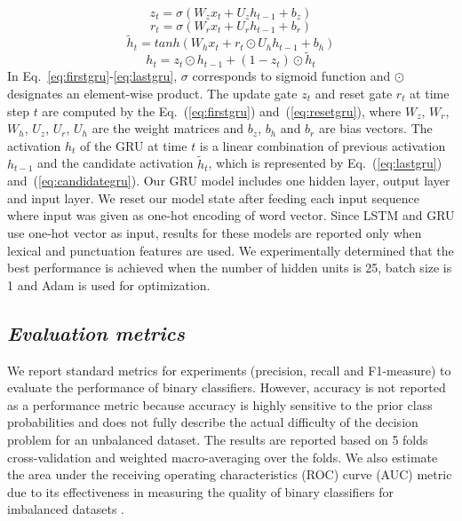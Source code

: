 \documentclass{amia}
\begin{document}
\begin{equation}
z_t = \sigma(W_zx_t + U_zh_{t-1} + b_z)
\label{eq:firstgru}
\end{equation}
\begin{equation}
r_t = \sigma(W_rx_t + U_rh_{t-1} + b_r)
\label{eq:resetgru}
\end{equation}
\begin{equation}
\tilde h_t = tanh(W_hx_t + r_t \odot U_hh_{t-1} + b_h) 
\label{eq:candidategru}
\end{equation}
\begin{equation}
h_t = z_t \odot h_{t-1} + (1-z_t) \odot \tilde h_t
\label{eq:lastgru}
\end{equation}  
In Eq.~\ref{eq:firstgru}-\ref{eq:lastgru}, $\sigma$ corresponds to sigmoid function and $\odot$ designates an element-wise product. The update gate $z_t$ and reset gate $r_t$ at time step $t$ are computed by the Eq.~(\ref{eq:firstgru}) and~(\ref{eq:resetgru}), where $W_z$, $W_r$, $W_h$, $U_z$, $U_r$, $U_h$ are the weight matrices and $b_z$, $b_h$ and $b_r$ are bias vectors. The activation $h_t$ of the GRU at time $t$ is a linear combination of previous activation $h_{t-1}$ and the candidate activation $\tilde h_t$, which is represented by Eq.~(\ref{eq:lastgru}) and~(\ref{eq:candidategru}). Our GRU model includes one hidden layer, output layer and input layer. We reset our model state after feeding each input sequence where input was given as one-hot encoding of word vector. Since LSTM and GRU use one-hot vector as input, results for these models are reported only when lexical and punctuation features are used. We experimentally determined that the best performance is achieved when the number of hidden units is 25, batch size is 1 and Adam\cite{kingma2014adam} is used for optimization.         
  
\subsection*{\textit{Evaluation metrics}}
We report standard metrics for experiments (precision, recall and F1-measure) to evaluate the performance of binary classifiers\cite{aas1999text}. However, accuracy is not reported as a performance metric because accuracy is highly sensitive to the prior class probabilities and does not fully describe the actual difficulty of the decision problem for an unbalanced dataset. The results are reported based on 5 folds cross-validation and weighted macro-averaging over the folds. We also estimate the area under the receiving operating characteristics (ROC) curve\cite{kumar2011receiver} (AUC) metric due to its effectiveness in measuring the quality of binary classifiers for imbalanced datasets \cite{hu2015kernelized}. 
\end{document}
